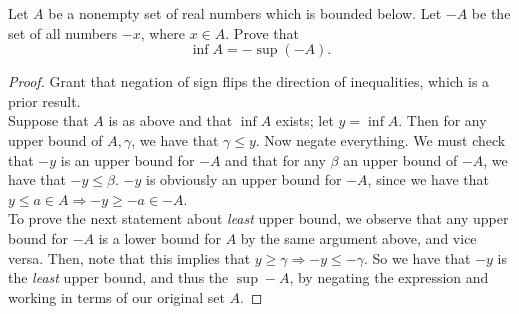 \documentclass{assignment}
\begin{document}
\begin{question}[5]
  Let $A$ be a nonempty set of real numbers which is bounded below. Let $-A$ be the set of all numbers
  $-x$, where $x\in A$. Prove that $$\inf A = -\sup(-A).$$
\end{question}
\begin{proof}
  Grant that negation of sign flips the direction of inequalities, which is a prior result. \\

  Suppose that $A$ is as above and that $\inf A$ exists; let $y = \inf A$. Then for any upper bound of 
  $A, \gamma$, we have that $\gamma \leq y$. Now negate everything. We must check that $-y$ is an upper
  bound for $-A$ and that for any $\beta$ an upper bound of $-A$, we have that $-y \leq \beta$. $-y$
  is obviously an upper bound for $-A$, since we have that $y \leq a\in A \Rightarrow -y \geq -a\in 
  -A$. \\
  
  To prove the next statement about \emph{least} upper bound, we observe that any upper bound
  for $-A$ is a lower bound for $A$ by the same argument above, and vice versa. Then, note that this
  implies that $y \geq \gamma \Rightarrow -y \leq -\gamma$. So we have that $-y$ is the \emph{least} 
  upper bound, and thus the $\sup -A$, by negating the expression and working in terms of our original 
  set $A$.
\end{proof}
\end{document}
